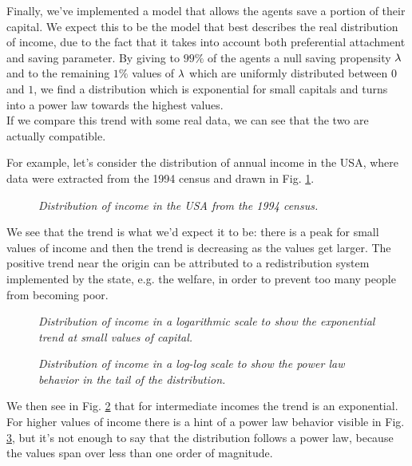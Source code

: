 Finally, we've implemented a model that allows the agents save a portion of their capital.
We expect this to be the model that best describes the real distribution of income, due to the fact that it takes into account both preferential attachment and saving parameter.
By giving to $99 \%$ of the agents a null saving propensity $\lambda$ and to the remaining $1 \%$ values of $\lambda$ which are uniformly distributed between $0$ and $1$, we find a distribution which is exponential for small capitals and turns into a power law towards the highest values. \\
If we compare this trend with some real data, we can see that the two are actually compatible.

For example, let's consider the distribution of annual income in the USA, where data were extracted from the 1994 census and drawn in Fig. \ref{fig:gloabl_realData}.
\begin{figure}[H]
    \centering
    \scalebox{.7}{}
    \caption{\emph{Distribution of income in the USA from the 1994 census.}}
    \label{fig:gloabl_realData}
\end{figure}
We see that the trend is what we'd expect it to be: there is a peak for small values of income and then the trend is decreasing as the values get larger.
The positive trend near the origin can be attributed to a redistribution system implemented by the state, e.g. the welfare, in order to prevent too many people from becoming poor. \\
\begin{figure}[H]
    \centering
    \scalebox{.7}{}
    \caption{\emph{Distribution of income in a logarithmic scale to show the exponential trend at small values of capital.}}
    \label{fig:real_head}
\end{figure}
\begin{figure}[H]
    \centering
    \scalebox{.7}{}
    \caption{\emph{Distribution of income in a log-log scale to show the power law behavior in the tail of the distribution.}}
    \label{fig:real_tail}
\end{figure}
We then see in Fig. \ref{fig:real_head} that for intermediate incomes the trend is an exponential.
For higher values of income there is a hint of a power law behavior visible in Fig. \ref{fig:real_tail}, but it's not enough to say that the distribution follows a power law, because the values span over less than one order of magnitude.
